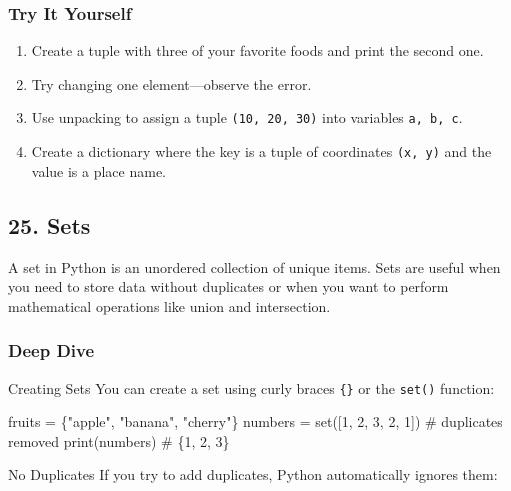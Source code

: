 \documentclass[
  letterpaper,
  DIV=11,
  numbers=noendperiod]{scrreprt}
\newenvironment{Shaded}{\begin{snugshade}}{\end{snugshade}}
\newcommand{\BuiltInTok}[1]{\textcolor[rgb]{0.00,0.23,0.31}{#1}}
\newcommand{\CommentTok}[1]{\textcolor[rgb]{0.37,0.37,0.37}{#1}}
\newcommand{\DecValTok}[1]{\textcolor[rgb]{0.68,0.00,0.00}{#1}}
\newcommand{\NormalTok}[1]{\textcolor[rgb]{0.00,0.23,0.31}{#1}}
\newcommand{\OperatorTok}[1]{\textcolor[rgb]{0.37,0.37,0.37}{#1}}
\newcommand{\StringTok}[1]{\textcolor[rgb]{0.13,0.47,0.30}{#1}}
\providecommand{\tightlist}{%
  \setlength{\itemsep}{0pt}\setlength{\parskip}{0pt}}
\begin{document}
\subsubsection{Try It Yourself}\label{try-it-yourself-24}

\begin{enumerate}
\def\labelenumi{\arabic{enumi}.}
\tightlist
\item
  Create a tuple with three of your favorite foods and print the second
  one.
\item
  Try changing one element---observe the error.
\item
  Use unpacking to assign a tuple \texttt{(10,\ 20,\ 30)} into variables
  \texttt{a,\ b,\ c}.
\item
  Create a dictionary where the key is a tuple of coordinates
  \texttt{(x,\ y)} and the value is a place name.
\end{enumerate}

\subsection{25. Sets}\label{sets}

A set in Python is an unordered collection of unique items. Sets are
useful when you need to store data without duplicates or when you want
to perform mathematical operations like union and intersection.

\subsubsection{Deep Dive}\label{deep-dive-25}

Creating Sets You can create a set using curly braces \texttt{\{\}} or
the \texttt{set()} function:

\begin{Shaded}
\begin{Highlighting}[]
\NormalTok{fruits }\OperatorTok{=}\NormalTok{ \{}\StringTok{"apple"}\NormalTok{, }\StringTok{"banana"}\NormalTok{, }\StringTok{"cherry"}\NormalTok{\}}
\NormalTok{numbers }\OperatorTok{=} \BuiltInTok{set}\NormalTok{([}\DecValTok{1}\NormalTok{, }\DecValTok{2}\NormalTok{, }\DecValTok{3}\NormalTok{, }\DecValTok{2}\NormalTok{, }\DecValTok{1}\NormalTok{])  }\CommentTok{\# duplicates removed}
\BuiltInTok{print}\NormalTok{(numbers)  }\CommentTok{\# \{1, 2, 3\}}
\end{Highlighting}
\end{Shaded}

No Duplicates If you try to add duplicates, Python automatically ignores
them:
\end{document}
